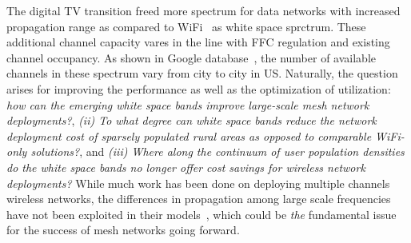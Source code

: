 The digital TV transition freed more spectrum for data networks with increased propagation 
range as compared to WiFi~\cite{balanis2012antenna} as white space sprctrum. These additional 
channel capacity vares in the line with FFC regulation and existing channel occupancy. As shown 
in Google database~\cite{googledatabase}, the number of available channels in these spectrum 
vary from city to city in US. Naturally, the question arises for improving the performance as 
well as the optimization of utilization: {\it how can the emerging white space bands improve 
large-scale mesh network deployments?}, {\it (ii) To what degree can white space bands reduce 
the network deployment cost of sparsely populated rural areas as opposed to comparable WiFi-only 
solutions?}, and {\it (iii) Where along the continuum of user population densities do the white 
space bands no longer offer cost savings for wireless network deployments?} While much work has 
been done on deploying multiple channels wireless networks, the differences in propagation among 
large scale frequencies have not been exploited in their models~\cite{tang2005interference, 
long2013fair,doraghinejad2014channel}, which could be {\it the} fundamental issue for the success 
of mesh networks going forward. 



